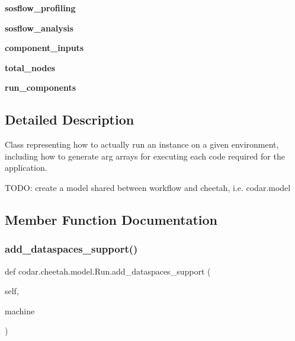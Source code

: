 \begin{DoxyCompactItemize}
{\bfseries sosflow\+\_\+profiling}
\item 
\mbox{\label{classcodar_1_1cheetah_1_1model_1_1_run_a5713827ad4bde77d4fcf46c05f10b554}} 
{\bfseries sosflow\+\_\+analysis}
\item 
\mbox{\label{classcodar_1_1cheetah_1_1model_1_1_run_aef7a539e9aa216737394edbdcf0ea726}} 
{\bfseries component\+\_\+inputs}
\item 
\mbox{\label{classcodar_1_1cheetah_1_1model_1_1_run_a441a213a4a37f8cde9db77ecb9a72e89}} 
{\bfseries total\+\_\+nodes}
\item 
\mbox{\label{classcodar_1_1cheetah_1_1model_1_1_run_a88ee35c04cfd039b398f131a50949305}} 
{\bfseries run\+\_\+components}
\end{DoxyCompactItemize}


\subsection{Detailed Description}
\begin{DoxyVerb}Class representing how to actually run an instance on a given environment,
including how to generate arg arrays for executing each code required for
the application.

TODO: create a model shared between workflow and cheetah, i.e. codar.model
\end{DoxyVerb}
 

\subsection{Member Function Documentation}
\mbox{\label{classcodar_1_1cheetah_1_1model_1_1_run_a5fc7b380524cfda5c77104b61e4441fd}} 
\subsubsection{\texorpdfstring{add\+\_\+dataspaces\+\_\+support()}{add\_dataspaces\_support()}}
{\footnotesize\ttfamily def codar.\+cheetah.\+model.\+Run.\+add\+\_\+dataspaces\+\_\+support (\begin{DoxyParamCaption}\item[{}]{self,  }\item[{}]{machine }\end{DoxyParamCaption})}

